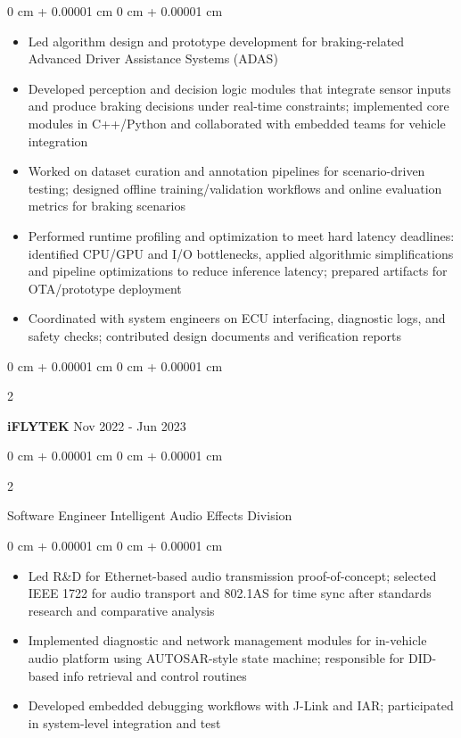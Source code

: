 \documentclass[10pt, a4paper]{article}
\newenvironment{highlights}{
    \begin{itemize}[
        topsep=0.15 cm,
        parsep=0.08 cm,
        partopsep=0pt,
        itemsep=0.05 cm,
        leftmargin=0 cm + 10pt
    ]
}{
    \end{itemize}
} %
\newenvironment{onecolentry}{
    \begin{adjustwidth}{
        0 cm + 0.00001 cm
    }{
        0 cm + 0.00001 cm
    }
}{
    \end{adjustwidth}
} %
\newenvironment{twocolentry}[2][]{
    \onecolentry
    \def\secondColumn{#2}
    \setcolumnwidth{\fill, 4.5 cm}
    \begin{paracol}{2}
}{
    \switchcolumn \raggedleft \secondColumn
    \end{paracol}
    \endonecolentry
} %
\begin{document}
        \vspace{0.10 cm}
        \begin{onecolentry}
            \begin{highlights}
                \item Led algorithm design and prototype development for braking-related Advanced Driver Assistance Systems (ADAS)
                \item Developed perception and decision logic modules that integrate sensor inputs and produce braking decisions under real-time constraints; implemented core modules in C++/Python and collaborated with embedded teams for vehicle integration
                \item Worked on dataset curation and annotation pipelines for scenario-driven testing; designed offline training/validation workflows and online evaluation metrics for braking scenarios
                \item Performed runtime profiling and optimization to meet hard latency deadlines: identified CPU/GPU and I/O bottlenecks, applied algorithmic simplifications and pipeline optimizations to reduce inference latency; prepared artifacts for OTA/prototype deployment
                \item Coordinated with system engineers on ECU interfacing, diagnostic logs, and safety checks; contributed design documents and verification reports
            \end{highlights}
        \end{onecolentry}

        \vspace{0.2 cm}

        \begin{twocolentry}{
            Nov 2022 - Jun 2023
        }
            \textbf{iFLYTEK}\end{twocolentry}

        \begin{twocolentry}{
            
        }
            Software Engineer Intelligent Audio Effects Division\end{twocolentry}

        \vspace{0.10 cm}
        \begin{onecolentry}
            \begin{highlights}
                \item Led R\&D for Ethernet-based audio transmission proof-of-concept; selected IEEE 1722 for audio transport and 802.1AS for time sync after standards research and comparative analysis
                \item Implemented diagnostic and network management modules for in-vehicle audio platform using AUTOSAR-style state machine; responsible for DID-based info retrieval and control routines
                \item Developed embedded debugging workflows with J-Link and IAR; participated in system-level integration and test
            \end{highlights}
        \end{onecolentry}
\end{document}
